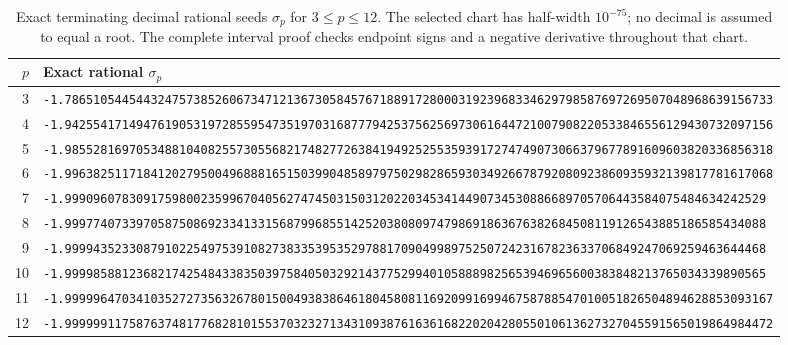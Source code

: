 \begin{table}[htbp]
\centering
\caption{Exact terminating decimal rational seeds $\sigma_p$ for $3\le p\le12$.
The selected chart has half-width $10^{-75}$; no decimal is
assumed to equal a root.  The complete interval proof checks
endpoint signs and a negative derivative throughout that chart.}
\label{tab:seeds}
\begingroup\fontsize{5.0}{6.6}\selectfont
\begin{tabular}{@{}r l@{}}
\toprule
$p$ & Exact rational $\sigma_p$\\ \midrule
3&\texttt{-1.786510544544324757385260673471213673058457671889172800031923968334629798587697269507048968639156733}\\
4&\texttt{-1.942554171494761905319728559547351970316877794253756256973061644721007908220533846556129430732097156}\\
5&\texttt{-1.985528169705348810408255730556821748277263841949252553593917274749073066379677891609603820336856318}\\
6&\texttt{-1.996382511718412027950049688816515039904858979750298286593034926678792080923860935932139817781617068}\\
7&\texttt{-1.99909607830917598002359967040562747450315031202203453414490734530886689705706443584075484634242529}\\
8&\texttt{-1.99977407339705875086923341331568799685514252038080974798691863676382684508119126543885186585434088}\\
9&\texttt{-1.99994352330879102254975391082738335395352978817090499897525072423167823633706849247069259463644468}\\
10&\texttt{-1.99998588123682174254843383503975840503292143775299401058889825653946965600383848213765034339890565}\\
11&\texttt{-1.999996470341035272735632678015004938386461804580811692099169946758788547010051826504894628853093167}\\
12&\texttt{-1.999999117587637481776828101553703232713431093876163616822020428055010613627327045591565019864984472}\\
\bottomrule
\end{tabular}
\endgroup
\end{table}
